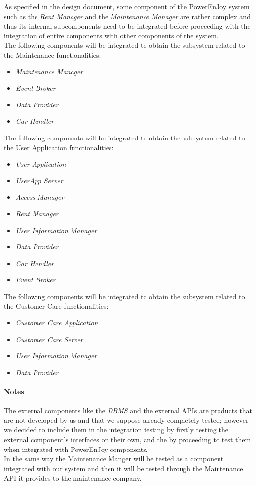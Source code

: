 As specified in the design document, some component of the PowerEnJoy system such as the \emph{Rent Manager} and the \emph{Maintenance Manager} are rather complex and thus its internal subcomponents need to be integrated before proceeding with the integration of entire components with other components of the system.\\

The following components will be integrated to obtain the subsystem related to the Maintenance functionalities:

\begin{itemize}
	\item \emph{Maintenance Manager}
	\item \emph{Event Broker}
	\item \emph{Data Provider}
	\item \emph{Car Handler}
\end{itemize}

The following components will be integrated to obtain the subsystem related to the User Application functionalities:

\begin{itemize}
	\item \emph{User Application}
	\item \emph{UserApp Server}
	\item \emph{Access Manager}
	\item \emph{Rent Manager}
	\item \emph{User Information Manager}
	\item \emph{Data Provider}
	\item \emph{Car Handler}
	\item \emph{Event Broker}
\end{itemize}

The following components will be integrated to obtain the subsystem related to the Customer Care functionalities:

\begin{itemize}
	\item \emph{Customer Care Application}
	\item \emph{Customer Care Server}
	\item \emph{User Information Manager}
	\item \emph{Data Provider}
\end{itemize}

\paragraph{Notes}
The external components like the \emph{DBMS} and the external APIs are products that are not developed by us and that we suppose already completely tested; however we decided to include them in the integration testing by firstly testing the external component's interfaces on their own, and the by proceeding to test them when integrated with PowerEnJoy components.\\
In the same way the Maintenance Manger will be tested as a component integrated with our system and then it will be tested through the Maintenance API it provides to the maintenance company. 

